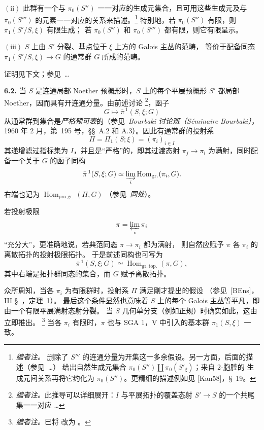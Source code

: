 \smallskip
\noindent
\(\mathrm{(ii)}\) 此群有一个与 \(\pi_0(S'')\) 一一对应的生成元集合，且可用这些生成元及与
\(\pi_0(S''')\) 的元素一一对应的关系来描述。\footnote{\textit{编者注。}
删除了 \(S'''\) 的连通分量为开集这一多余假设。另一方面，后面的描述（参见\ \ldots）
给出自然生成元集合 \(\pi_0(S'')\amalg\pi_0(S'_\xi)\)；来自 \(2\)-胞腔的
生成元间关系再将它约化为 \(\pi_0(S'')\)。更精细的描述例如见 [Kan58]，\S~19。}
特别地，若 \(\pi_0(S'')\) 有限，则 \(\pi_1(S'/S,\xi)\) 有限生成；
若 \(\pi_0(S'')\) 和 \(\pi_0(S''')\) 都有限，则它有限呈示。

\smallskip
\noindent
\(\mathrm{(iii)}\) \(S\) 上由 \(S'\) 分裂、基点位于 \(\xi\) 上方的 Galois 主丛的范畴，
等价于配备同态 \(\pi_1(S'/S,\xi)\to G\) 的通常群 \(G\) 所成的范畴。
\par\endgroup

证明见下文；参见\ \ldots

\par\medskip\noindent
\textbf{6.2.}\enspace
当 \(S\) 是连通局部 Noether 预概形时，\(S\) 上的每个平展预概形 \(S'\)
都局部 Noether，因而具有开连通分量。由前述讨论
\footnote{\textit{编者注。}此推导可以详细展开：\(I\) 与平展拓扑的覆盖态射
\(S'\to S\) 的一个共尾集一一对应 \ldots}，函子
\[
  G\longmapsto\bar\pi^{\,1}(S,\xi;G)
\]
从通常群到集合是\emph{严格预可表}的（参见\ \emph{Bourbaki 讨论班〔Séminaire Bourbaki〕}，
1960 年 2 月，第~195 号，\S\S~A.2 和 A.3）。因此有通常群的投射系
\[
  \Pi=\Pi_1(S;\xi)=(\pi_i)_{i\in I}
\]
其递增滤过指标集为 \(I\)，并且是“严格”的，即其过渡态射 \(\pi_j\to\pi_i\)
为满射，同时配备一个关于 \(G\) 的函子同构
\[
  \bar\pi^{\,1}(S,\xi;G)
  \simeq
  \varinjlim_i\operatorname{Hom}_{\mathrm{gr.}}(\pi_i,G).
\]
右端也记为 \(\operatorname{Hom}_{\mathrm{pro\text{-}gr.}}(\Pi,G)\)
（参见\ \emph{同处}）。

若投射极限
\[
  \pi=\varprojlim_i\pi_i
\]
“充分大”，更准确地说，若典范同态 \(\pi\to\pi_i\) 都为满射，
则自然应赋予 \(\pi\) 各 \(\pi_i\) 的离散拓扑的投射极限拓扑。
于是前述同构也可写为
\[
  \bar\pi^{\,1}(S,\xi;G)
  \simeq
  \operatorname{Hom}_{\mathrm{gr.\,top.}}(\pi,G),
\]
其中右端是拓扑群同态的集合，而 \(G\) 赋予离散拓扑。

众所周知，当各 \(\pi_i\) 为有限群时，投射系 \(\Pi\) 满足刚才提出的假设
（参见\ [BEns]，III \S~，定理~1）。
最后这个条件显然也意味着 \(S\) 上的每个 Galois 主丛等平凡，即由一个有限平展满射态射分裂。
当 \(S\) 几何单分支（例如正规）时确实如此，这由
 立即推出。
\footnote{\textit{编者注。}已将  改为
。}
当各 \(\pi_i\) 有限时，\(\pi\) 也与 SGA 1，V 中引入的基本群 \(\pi_1(S,\xi)\) 一致。

